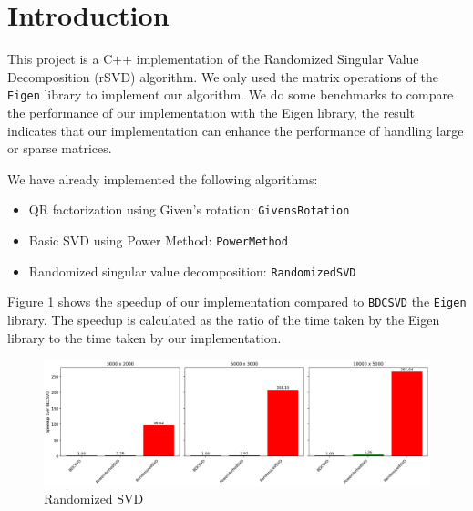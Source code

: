 \documentclass[11pt,a4paper]{article}
\begin{document}


\section{Introduction}
This project is a C++ implementation of the Randomized Singular Value Decomposition (rSVD) algorithm. We only used the matrix operations of the \texttt{Eigen} library to implement our algorithm. We do some benchmarks to compare the performance of our implementation with the Eigen library, the result indicates that our implementation can enhance the performance of handling large or sparse matrices.

We have already implemented the following algorithms:

\begin{itemize}
    \item QR factorization using Given's rotation: \texttt{GivensRotation}
    \item Basic SVD using Power Method: \texttt{PowerMethod}
    \item Randomized singular value decomposition: \texttt{RandomizedSVD}
\end{itemize}

Figure \ref{fig:speedup} shows the speedup of our implementation compared to \texttt{BDCSVD} the \texttt{Eigen} library. The speedup is calculated as the ratio of the time taken by the Eigen library to the time taken by our implementation.

\begin{figure}[H]
    \centering
    \includegraphics[width=\textwidth]{Images/speedup.png}
    \caption{Randomized SVD}
    \label{fig:speedup}
\end{figure}
\end{document}
